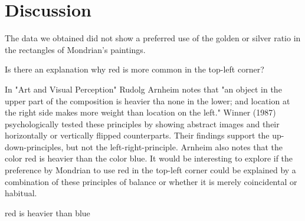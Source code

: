\section{Discussion} \label{conclusion}




The data we obtained did not show a preferred use of the golden or silver ratio
in the rectangles of Mondrian's paintings.





Is there an explanation why red is more common in the top-left corner?

In "Art and Visual Perception" Rudolg Arnheim \cite{Arnheim1965} notes that "an
object in the upper part of the composition is heavier tha none in the lower;
and location at the right side makes more weight than location on the left."
Winner (1987) \cite{Winner1987} psychologically tested these principles by
showing abstract images and their horizontally or vertically flipped
counterparts. Their findings support the up-down-principles, but not the
left-right-principle. Arnheim also notes that the color red is heavier than the
color blue.
It would be interesting to explore if the preference by Mondrian to
use red in the top-left corner could be explained by a combination of these
principles of balance or whether it is merely coincidental or habitual.

red is heavier than blue
